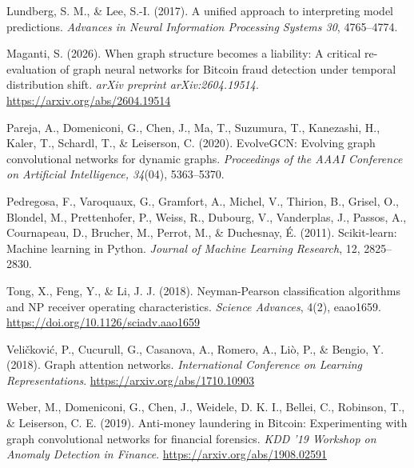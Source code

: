 \documentclass[11pt]{article}
\begin{document}
Lundberg, S. M., \& Lee, S.-I. (2017). A unified approach to interpreting model predictions. \emph{Advances in Neural Information Processing Systems 30}, 4765--4774.

Maganti, S. (2026). When graph structure becomes a liability: A critical re-evaluation of graph neural networks for Bitcoin fraud detection under temporal distribution shift. \emph{arXiv preprint arXiv:2604.19514}. \url{https://arxiv.org/abs/2604.19514}

Pareja, A., Domeniconi, G., Chen, J., Ma, T., Suzumura, T., Kanezashi, H., Kaler, T., Schardl, T., \& Leiserson, C. (2020). EvolveGCN: Evolving graph convolutional networks for dynamic graphs. \emph{Proceedings of the AAAI Conference on Artificial Intelligence, 34}(04), 5363--5370.

Pedregosa, F., Varoquaux, G., Gramfort, A., Michel, V., Thirion, B., Grisel, O., Blondel, M., Prettenhofer, P., Weiss, R., Dubourg, V., Vanderplas, J., Passos, A., Cournapeau, D., Brucher, M., Perrot, M., \& Duchesnay, \'{E}. (2011). Scikit-learn: Machine learning in Python. \emph{Journal of Machine Learning Research}, 12, 2825--2830.

Tong, X., Feng, Y., \& Li, J. J. (2018). Neyman-Pearson classification algorithms and NP receiver operating characteristics. \emph{Science Advances}, 4(2), eaao1659. \url{https://doi.org/10.1126/sciadv.aao1659}

Veli\v{c}kovi\'{c}, P., Cucurull, G., Casanova, A., Romero, A., Li\`{o}, P., \& Bengio, Y. (2018). Graph attention networks. \emph{International Conference on Learning Representations}. \url{https://arxiv.org/abs/1710.10903}

Weber, M., Domeniconi, G., Chen, J., Weidele, D. K. I., Bellei, C., Robinson, T., \& Leiserson, C. E. (2019). Anti-money laundering in Bitcoin: Experimenting with graph convolutional networks for financial forensics. \emph{KDD '19 Workshop on Anomaly Detection in Finance}. \url{https://arxiv.org/abs/1908.02591}

\endgroup
\end{document}
